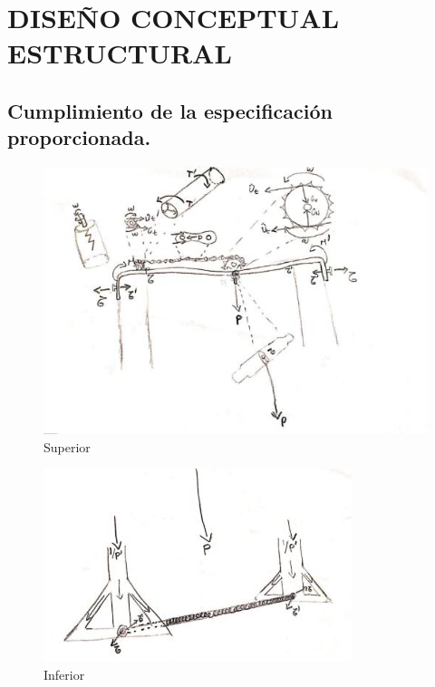 
\chapter{DISEÑO CONCEPTUAL ESTRUCTURAL}







\section{Cumplimiento de la especificación \\proporcionada.} %

\begin{figure}[h]
  \centering
    \includegraphics[width=\textwidth]{A/figs/A_1.jpg}  
    \caption{Superior} %
\end{figure}

\begin{figure}[h]
  \centering
    \includegraphics[width=\textwidth]{A/figs/A_2.jpg}  
    \caption{Inferior} %
\end{figure}
\ \ \ 
